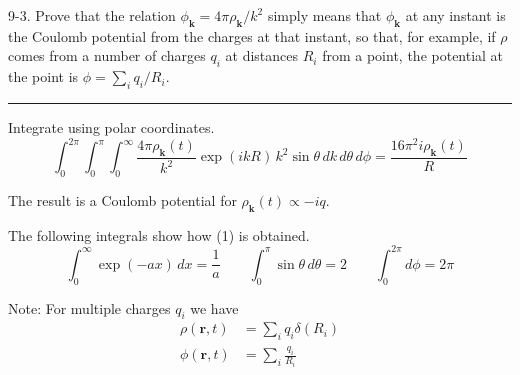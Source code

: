 \documentclass[12pt]{article}
\begin{document}
9-3.
Prove that the relation $\phi_{\mathbf k}=4\pi\rho_{\mathbf k}/k^2$
simply means that $\phi_{\mathbf k}$ at any instant is the Coulomb
potential from the charges at that instant, so that, for example,
if $\rho$ comes from a number of charges $q_i$ at distances $R_i$
from a point, the potential at the point is
$\phi=\sum_iq_i/R_i$.

\bigskip
\hrule

\bigskip
Integrate using polar coordinates.
\begin{equation*}
\int_0^{2\pi}\int_0^\pi\int_0^\infty
\frac{4\pi\rho_{\mathbf k}(t)}{k^2}\exp(ikR)\,k^2\sin\theta\,dk\,d\theta\,d\phi
=\frac{16\pi^2i\rho_{\mathbf k}(t)}{R}
\tag{1}
\end{equation*}

The result is a Coulomb potential for
$\rho_{\mathbf k}(t)\propto -iq$.

\bigskip
The following integrals show how (1) is obtained.
\begin{equation*}
\int_0^\infty\exp(-a x)\,dx=\frac{1}{a}
\qquad
\int_0^\pi\sin\theta\,d\theta=2
\qquad
\int_0^{2\pi}d\phi=2\pi
\end{equation*}

Note: For multiple charges $q_i$ we have
\begin{align*}
\rho(\mathbf r,t)&=\sum_iq_i\delta(R_i)
\\
\phi(\mathbf r,t)&=\sum_i\frac{q_i}{R_i}
\end{align*}
\end{document}
